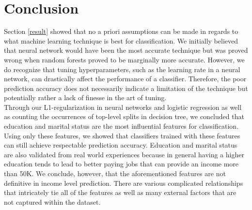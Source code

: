 \documentclass[conference]{IEEEtran}
\begin{document}
\section{Conclusion}
Section \ref{result} showed that no a priori assumptions can be made in regards to what machine learning technique is best for classification. We initially believed that neural network would have been the most accurate technique but was proved wrong when random forests proved to be marginally more accurate. However, we do recognize that tuning hyperparameters, such as the learning rate in a neural network, can drastically affect the performance of a classifier. Therefore, the poor prediction accuracy does not necessarily indicate a limitation of the technique but potentially rather a lack of finesse in the art of tuning. \\
Through our L1-regularization in neural networks and logistic regression as well as counting the occurrences of top-level splits in decision tree, we concluded that education and marital status are the most influential features for classification. Using only these features, we showed that classifiers trained with these features can still achieve respectable prediction accuracy. Education and marital status are also validated from real world experiences because in general having a higher education tends to lead to better paying jobs that can provide an income more than 50K. We conclude, however, that the aforementioned features are not definitive in income level prediction. There are various complicated relationships that intricately tie all of the features as well as many external factors that are not captured within the dataset.


%
\end{document}
